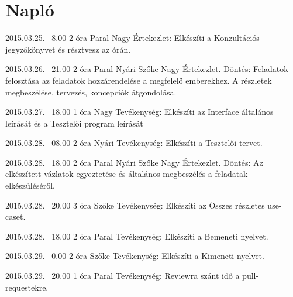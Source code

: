 %
\section{Napló}

\begin{naplo}
	
	\bejegyzes
	{2015.03.25. ~8.00}
	{2 óra}
    {Paral Nagy} 
	{Értekezlet: Elkészíti a Konzultációs jegyzőkönyvet és résztvesz az órán.\newline } 
	
	\bejegyzes
	{2015.03.26. ~21.00}
	{2 óra}
	{Paral \newline Nyári \newline Szőke \newline Nagy} 
	{Értekezlet.
		Döntés: Feladatok felosztása az feladatok hozzárendelése a megfelelő emberekhez. A részletek megbeszélése, tervezés, koncepciók átgondolása.\newline } 

	\bejegyzes
	{2015.03.27. ~18.00}
	{1 óra}
	{Nagy} 
	{Tevékenység: Elkészíti az Interface általános leírását és a Tesztelői program leírását\newline } 			
	
	\bejegyzes
	{2015.03.28. ~08.00}
	{2 óra}
	{Nyári} 
	{Tevékenység: Elkészíti a Tesztelői tervet.\newline }
	
	\bejegyzes
	{2015.03.28. ~18.00}
	{2 óra}
	{Paral \newline Nyári \newline Szőke \newline Nagy} 
	{Értekezlet.
		Döntés: Az elkészített vázlatok egyeztetése és általános megbeszélés a feladatak elkészüléséről.\newline } 

	\bejegyzes
	{2015.03.28. ~20.00}
	{3 óra}
	{Szőke} 
	{Tevékenység: Elkészíti az Összes részletes use-caset.\newline }	

    \bejegyzes
    {2015.03.28. ~18.00}
    {2 óra}
    {Paral} 
    {Tevékenység: Elkészíti a Bemeneti nyelvet.\newline } 
    
	\bejegyzes
	{2015.03.29. ~0.00}
	{2 óra}
	{Szőke} 
	{Tevékenység: Elkészíti a Kimeneti nyelvet.\newline }     

    \bejegyzes
    {2015.03.29. ~20.00}
    {1 óra}
    {Paral} 
    {Tevékenység: Reviewra szánt idő a pull-requestekre.\newline } 


\end{naplo}
